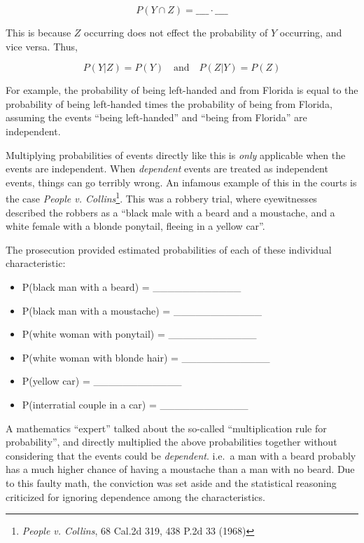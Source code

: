 \documentclass[]{book}
\providecommand{\tightlist}{%
  \setlength{\itemsep}{0pt}\setlength{\parskip}{0pt}}
\let\rmarkdownfootnote\footnote%
\def\footnote{\protect\rmarkdownfootnote}
\theoremstyle{definition}
\theoremstyle{definition}
\theoremstyle{remark}
\begin{document}
\[P(Y \cap Z) = \_\_\_\_ \cdot \_\_\_\_\]

This is because \(Z\) occurring does not effect the probability of \(Y\)
occurring, and vice versa. Thus,

\[ P(Y|Z) = P(Y) \quad \text{and} \quad P(Z|Y) = P(Z)\]

For example, the probability of being left-handed and from Florida is
equal to the probability of being left-handed times the probability of
being from Florida, assuming the events ``being left-handed'' and
``being from Florida'' are independent.

Multiplying probabilities of events directly like this is \emph{only}
applicable when the events are independent. When \emph{dependent} events
are treated as independent events, things can go terribly wrong. An
infamous example of this in the courts is the case
\textit{People v. Collins}\footnote{\emph{People v. Collins}, 68 Cal.2d
  319, 438 P.2d 33 (1968)}. This was a robbery trial, where eyewitnesses
described the robbers as a ``black male with a beard and a moustache,
and a white female with a blonde ponytail, fleeing in a yellow car''.

The prosecution provided estimated probabilities of each of these
individual characteristic:

\begin{itemize}
\tightlist
\item
  P(black man with a beard) = \_\_\_\_\_\_\_\_\_\_\_\_
\item
  P(black man with a moustache) = \_\_\_\_\_\_\_\_\_\_\_\_
\item
  P(white woman with ponytail) = \_\_\_\_\_\_\_\_\_\_\_\_
\item
  P(white woman with blonde hair) = \_\_\_\_\_\_\_\_\_\_\_\_
\item
  P(yellow car) = \_\_\_\_\_\_\_\_\_\_\_\_
\item
  P(interratial couple in a car) = \_\_\_\_\_\_\_\_\_\_\_\_
\end{itemize}

A mathematics ``expert'' talked about the so-called ``multiplication
rule for probability'', and directly multiplied the above probabilities
together without considering that the events could be \emph{dependent}.
i.e.~a man with a beard probably has a much higher chance of having a
moustache than a man with no beard. Due to this faulty math, the
conviction was set aside and the statistical reasoning criticized for
ignoring dependence among the characteristics.
\end{document}
